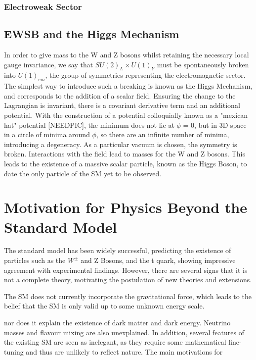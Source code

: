 \begin{description}
\subsubsection{Electroweak Sector}




\subsection{EWSB and the Higgs Mechanism}

In order to give mass to the W and Z bosons whilst retaining the necessary local gauge invariance, we say that $SU(2)_{L} \times U(1)_{Y}$ must be spontaneously broken into $U(1)_{em}$, the group of symmetries representing the electromagnetic sector. The simplest way to introduce such a breaking is known as the Higgs Mechanism, and corresponds to the addition of a scalar field. Ensuring the change to the Lagrangian is invariant, there is a covariant derivative term and an additional potential. With the construction of a potential colloquially known as a "mexican hat" potential [NEEDPIC], the minimum does not lie at $\phi$ = 0, but in 3D space in a circle of minima around $\phi$, so there are an infinite number of minima, introducing a degeneracy. As a particular vacuum is chosen, the symmetry is broken. Interactions with the field lead to masses for the W and Z bosons. This leads to the existence of a massive scalar particle, known as the Higgs Boson, to date the only particle of the SM yet to be observed. 


\section{Motivation for Physics Beyond the Standard Model}
The standard model has been widely successful, predicting the existence of particles such as the $W^{\pm}$ and Z Bosons, and the t quark, showing impressive agreement with experimental findings. However, there are several signs that it is not a complete theory, motivating the postulation of new theories and extensions. 

The SM does not currently incorporate the gravitational force, which leads to the belief that the SM is only valid up to some unknown energy scale.

 nor does it explain the existence of dark matter and dark energy. Neutrino masses and flavour mixing are also unexplained. In addition, several features of the existing SM are seen as inelegant, as they require some mathematical fine-tuning and thus are unlikely to reflect nature. The main motivations for 

\end{description}
